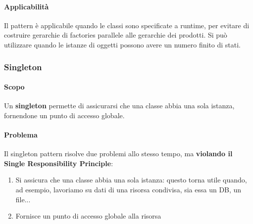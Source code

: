 \documentclass[11pt]{article}
\begin{document}
\paragraph{Applicabilità}
Il pattern è applicabile quando le classi sono specificate a runtime, per evitare di costruire gerarchie di factories parallele alle gerarchie dei prodotti. Si può utilizzare quando le istanze di oggetti possono avere un numero finito di stati.

\subsubsection{Singleton}
\paragraph{Scopo}
Un \textbf{singleton} permette di assicurarsi che una classe abbia una sola istanza, fornendone un punto di accesso globale.
\paragraph{Problema}
Il singleton pattern risolve due problemi allo stesso tempo, ma \textbf{violando il Single Responsibility Principle}:
\begin{enumerate}
    \item Si assicura che una classe abbia una sola istanza: questo torna utile quando, ad esempio, lavoriamo su dati di una risorsa condivisa, sia essa un DB, un file...
    \item Fornisce un punto di accesso globale alla risorsa
\end{enumerate}
\end{document}

